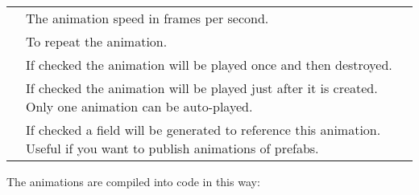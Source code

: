 \documentclass[letterpaper,10pt,english]{sphinxmanual}
\begin{document}
\begin{savenotes}\sphinxattablestart
\centering
\begin{tabulary}{\linewidth}[t]{|T|T|}
\hline
{}\relax &\relax \\
\hline
{}
&
The animation speed in frames per second.
\\
\hline
{}
&
To repeat the animation.
\\
\hline
{}
&
If checked the animation will be played once and then destroyed.
\\
\hline
{}
&
If checked the animation will be played just after it is created. Only one animation can be auto-played.
\\
\hline
{}
&
If checked a field will be generated to reference this animation. Useful if you want to publish animations of prefabs.
\\
\hline
\end{tabulary}
\par
\sphinxattableend\end{savenotes}

The animations are compiled into code in this way:

\begin{sphinxVerbatim}[commandchars=\\\{\}]
      
    \PYG{p}{[} \PYG{p}{]}  
 
 \PYG{p}{[}\PYG{p}{]}  
 \PYG{p}{[}\PYG{p}{]}  
\end{sphinxVerbatim}
\end{document}
